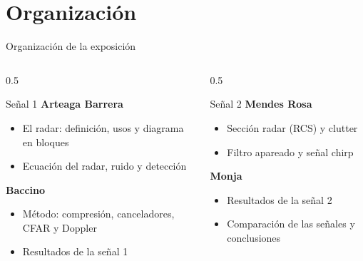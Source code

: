 \section[Organización]{Organización}
\begin{frame}{Organización de la exposición}
  \begin{columns}[T]
    \begin{column}{0.5\textwidth}
      \begin{block}{Señal 1}
        \small
        \textbf{Arteaga Barrera}
        \begin{itemize}
          \item El radar: definición, usos y diagrama en bloques
          \item Ecuación del radar, ruido y detección
        \end{itemize}
        \textbf{Baccino}
        \begin{itemize}
          \item Método: compresión, canceladores, CFAR y Doppler
          \item Resultados de la señal 1
        \end{itemize}
      \end{block}
    \end{column}
    \begin{column}{0.5\textwidth}
      \begin{block}{Señal 2}
        \small
        \textbf{Mendes Rosa}
        \begin{itemize}
          \item Sección radar (RCS) y clutter
          \item Filtro apareado y señal chirp
        \end{itemize}
        \textbf{Monja}
        \begin{itemize}
          \item Resultados de la señal 2
          \item Comparación de las señales y conclusiones
        \end{itemize}
      \end{block}
    \end{column}
  \end{columns}
\end{frame}

